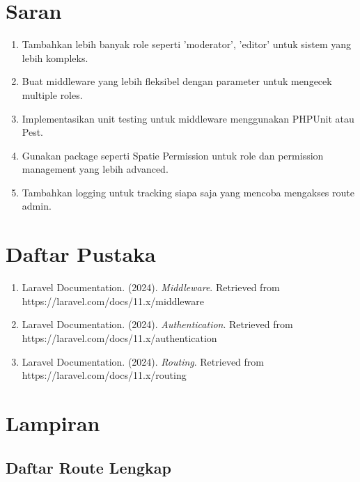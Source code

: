 \documentclass[a4paper,oneside,11pt]{book}
\begin{document}
\chapter{Saran}

\begin{enumerate}
    \item Tambahkan lebih banyak role seperti 'moderator', 'editor' untuk sistem yang lebih kompleks.
    
    \item Buat middleware yang lebih fleksibel dengan parameter untuk mengecek multiple roles.
    
    \item Implementasikan unit testing untuk middleware menggunakan PHPUnit atau Pest.
    
    \item Gunakan package seperti Spatie Permission untuk role dan permission management yang lebih advanced.
    
    \item Tambahkan logging untuk tracking siapa saja yang mencoba mengakses route admin.
\end{enumerate}

\chapter{Daftar Pustaka}

\begin{enumerate}
    \item Laravel Documentation. (2024). \textit{Middleware}. Retrieved from https://laravel.com/docs/11.x/middleware
    
    \item Laravel Documentation. (2024). \textit{Authentication}. Retrieved from https://laravel.com/docs/11.x/authentication
    
    \item Laravel Documentation. (2024). \textit{Routing}. Retrieved from https://laravel.com/docs/11.x/routing
\end{enumerate}

\chapter{Lampiran}

\section{Daftar Route Lengkap}
\end{document}
